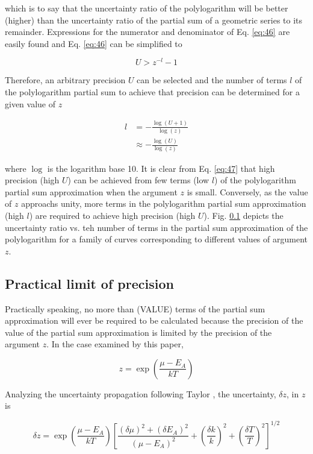 \documentclass[letterpaper,12pt]{article}
\begin{document}
\noindent which is to say that the uncertainty ratio of the polylogarithm will be better (higher) than the uncertainty ratio of the partial sum of a geometric series to its remainder. Expressions for the numerator and denominator of Eq. \ref{eq:46} are easily found and Eq. \ref{eq:46} can be simplified to

\begin{equation} \label{eq:47}
U > z^{-l} - 1
\end{equation}

\noindent Therefore, an arbitrary precision $U$ can be selected and the number of terms $l$ of the polylogarithm partial sum to achieve that precision can be determined for a given value of $z$

\begin{align} \label{eq:48}
l &= -\frac{\log(U+ 1)}{\log(z)} \\
 &\approx -\frac{\log(U)}{\log(z)}
\end{align}

\noindent where $\log$ is the logarithm base 10. It is clear from Eq. \ref{eq:47} that high precision (high $U$) can be achieved from few terms (low $l$) of the polylogarithm partial sum approximation when the argument $z$ is small. Conversely, as the value of $z$ approachs unity, more terms in the polylogarithm partial sum approximation (high $l$) are required to achieve high precision (high $U$). Fig. \ref{} depicts the uncertainty ratio vs. teh number of terms in the partial sum approximation of the polylogarithm for a family of curves corresponding to different values of argument $z$.

\subsection{Practical limit of precision}
Practically speaking, no more than (VALUE) terms of the partial sum approximation will ever be required to be calculated because the precision of the value of the partial sum approximation is limited by the precision of the argument $z$. In the case examined by this paper, 

\begin{equation} \label{eq:49}
z = \exp \left( \frac{\mu - E_{A}}{kT} \right)
\end{equation}

Analyzing the uncertainty propagation following Taylor \cite{9780935702422}, the uncertainty, $\delta z$, in $z$ is

\begin{equation} \label{eq:50}
\delta z = \exp \left( \frac{\mu - E_{A}}{kT} \right) \left[\frac{(\delta \mu)^{2} + (\delta E_{A})^{2}}{(\mu - E_{A})^{2}} + \left( \frac{\delta k}{k} \right)^{2} + \left( \frac{\delta T}{T} \right)^{2} \right]^{1/2}
\end{equation}
\end{document}
